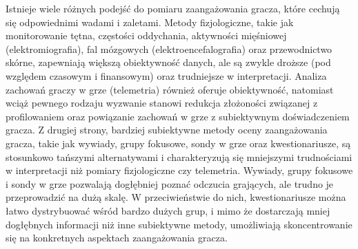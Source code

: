 Istnieje wiele różnych podejść do pomiaru zaangażowania gracza, które cechują się odpowiednimi wadami i zaletami.
Metody fizjologiczne, takie jak monitorowanie tętna, częstości oddychania, aktywności
mięśniowej (elektromiografia), fal mózgowych (elektroencefalografia) oraz przewodnictwo skórne,
zapewniają większą obiektywność danych, ale są zwykle droższe (pod względem czasowym i finansowym) oraz
trudniejsze w interpretacji\cite{validation_of_ge_scales}.
Analiza zachowań graczy w grze (telemetria) również oferuje obiektywność,
natomiast wciąż pewnego rodzaju wyzwanie stanowi redukcja złożoności związanej z
profilowaniem oraz powiązanie zachowań w grze z subiektywnym doświadczeniem gracza. Z drugiej strony,
bardziej subiektywne metody oceny zaangażowania gracza, takie jak wywiady, grupy fokusowe, sondy w grze oraz
kwestionariusze, są stosunkowo tańszymi alternatywami i charakteryzują się mniejszymi trudnościami w
interpretacji niż pomiary fizjologiczne czy telemetria\cite{validation_of_ge_scales}.
Wywiady, grupy fokusowe i sondy w grze pozwalają dogłębniej poznać odczucia grających, ale trudno je przeprowadzić na
dużą skalę. W przeciwieństwie do nich, kwestionariusze można łatwo dystrybuować wśród bardzo dużych grup,
i mimo że dostarczają mniej dogłębnych informacji niż inne subiektywne metody, umożliwiają skoncentrowanie
się na konkretnych aspektach zaangażowania gracza\cite{validation_of_ge_scales}.

